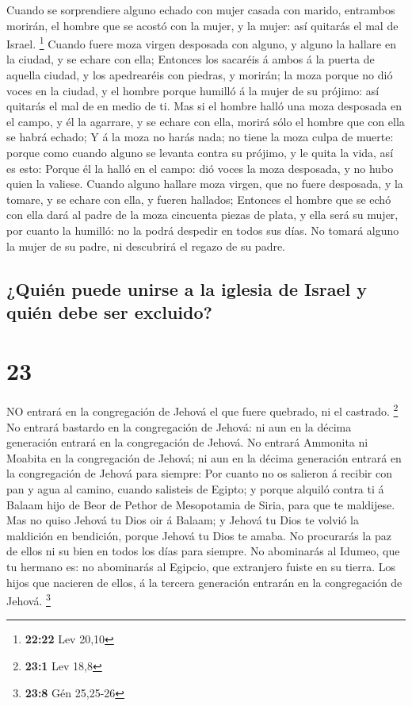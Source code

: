  Cuando se sorprendiere alguno echado con mujer casada con
marido, entrambos morirán, el hombre que se acostó con la mujer, y la
mujer: así quitarás el mal de Israel. \footnote{\textbf{22:22} Lev 20,10}
 Cuando fuere moza virgen desposada con alguno, y alguno la
hallare en la ciudad, y se echare con ella;  Entonces los
sacaréis á ambos á la puerta de aquella ciudad, y los apedrearéis con
piedras, y morirán; la moza porque no dió voces en la ciudad, y el
hombre porque humilló á la mujer de su prójimo: así quitarás el mal de
en medio de ti.  Mas si el hombre halló una moza desposada
en el campo, y él la agarrare, y se echare con ella, morirá sólo el
hombre que con ella se habrá echado;  Y á la moza no harás
nada; no tiene la moza culpa de muerte: porque como cuando alguno se
levanta contra su prójimo, y le quita la vida, así es esto:
 Porque él la halló en el campo: dió voces la moza
desposada, y no hubo quien la valiese.  Cuando alguno
hallare moza virgen, que no fuere desposada, y la tomare, y se echare
con ella, y fueren hallados;  Entonces el hombre que se
echó con ella dará al padre de la moza cincuenta piezas de plata, y ella
será su mujer, por cuanto la humilló: no la podrá despedir en todos sus
días.  No tomará alguno la mujer de su padre, ni descubrirá
el regazo de su padre.

\hypertarget{quiuxe9n-puede-unirse-a-la-iglesia-de-israel-y-quiuxe9n-debe-ser-excluido}{%
\subsection{¿Quién puede unirse a la iglesia de Israel y quién debe ser
excluido?}\label{quiuxe9n-puede-unirse-a-la-iglesia-de-israel-y-quiuxe9n-debe-ser-excluido}}

\hypertarget{section-22}{%
\section{23}\label{section-22}}

 NO entrará en la congregación de Jehová el que fuere
quebrado, ni el castrado. \footnote{\textbf{23:1} Lev 18,8} 
No entrará bastardo en la congregación de Jehová: ni aun en la décima
generación entrará en la congregación de Jehová.  No entrará
Ammonita ni Moabita en la congregación de Jehová; ni aun en la décima
generación entrará en la congregación de Jehová para siempre:
 Por cuanto no os salieron á recibir con pan y agua al
camino, cuando salisteis de Egipto; y porque alquiló contra ti á Balaam
hijo de Beor de Pethor de Mesopotamia de Siria, para que te maldijese.
 Mas no quiso Jehová tu Dios oir á Balaam; y Jehová tu Dios
te volvió la maldición en bendición, porque Jehová tu Dios te amaba.
 No procurarás la paz de ellos ni su bien en todos los días
para siempre.  No abominarás al Idumeo, que tu hermano es:
no abominarás al Egipcio, que extranjero fuiste en su tierra.
 Los hijos que nacieren de ellos, á la tercera generación
entrarán en la congregación de Jehová. \footnote{\textbf{23:8} Gén
  25,25-26}

